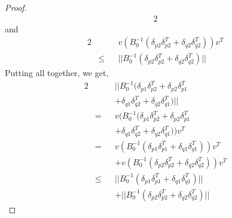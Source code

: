 \begin{proof}
\begin{alignat*}{2}
\end{alignat*}
and
\begin{alignat*}{2}
 & && v(B_0^{-1}(\delta_{p2}\delta_{p2}^T + \delta_{q2}\delta_{q2}^T))v^T \\
 & \leq && ||B_0^{-1}(\delta_{p2}\delta_{p2}^T + \delta_{q2}\delta_{q2}^T)||
\end{alignat*}
Putting all together, we get,
\begin{alignat*}{2}
& &&||B_0^{-1}(\delta_{p1}\delta_{p2}^T+\delta_{p2}\delta_{p1}^T \\
& &&+\delta_{q1}\delta_{q2}^T+\delta_{q2}\delta_{q1}^T)|| \\
& = && v(B_0^{-1}(\delta_{p1}\delta_{p2}^T+\delta_{p2}\delta_{p1}^T\\
& && +\delta_{q1}\delta_{q2}^T+\delta_{q2}\delta_{q1}^T))v^T\\
& = && v(B_0^{-1}(\delta_{p1}\delta_{p1}^T + \delta_{q1}\delta_{q1}^T))v^T \\
& && + v(B_0^{-1}(\delta_{p2}\delta_{p2}^T + \delta_{q2}\delta_{q2}^T))v^T \\
& \leq &&  ||B_0^{-1}(\delta_{p1}\delta_{p1}^T + \delta_{q1}\delta_{q1}^T)|| \\
& && + ||B_0^{-1}(\delta_{p2}\delta_{p2}^T + \delta_{q2}\delta_{q2}^T)||
\end{alignat*}

\end{proof}